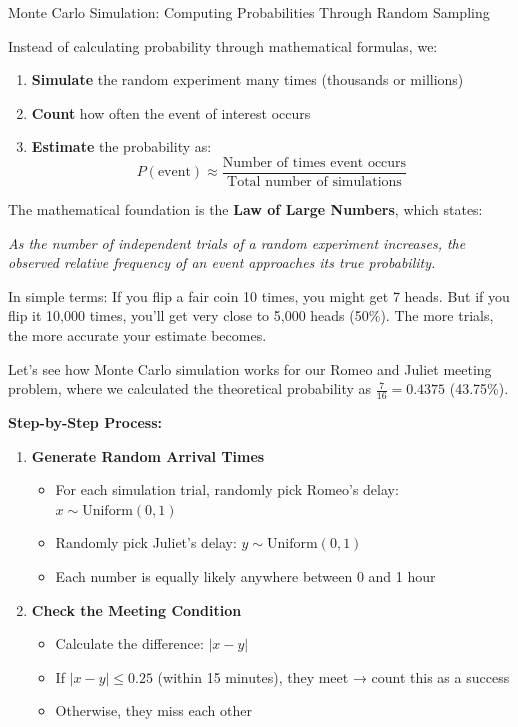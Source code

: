 \begin{itemize}
\begin{keyconceptboxbreak}{Monte Carlo Simulation: Computing Probabilities Through Random Sampling}

Instead of calculating probability through mathematical formulas, we:
\begin{enumerate}
    \item \textbf{Simulate} the random experiment many times (thousands or millions)
    \item \textbf{Count} how often the event of interest occurs
    \item \textbf{Estimate} the probability as:
    \[
    P(\text{event}) \approx \frac{\text{Number of times event occurs}}{\text{Total number of simulations}}
    \]
\end{enumerate}


The mathematical foundation is the \textbf{Law of Large Numbers}, which states:

\textit{As the number of independent trials of a random experiment increases, the observed relative frequency of an event approaches its true probability.}

In simple terms: If you flip a fair coin 10 times, you might get 7 heads. But if you flip it 10,000 times, you'll get very close to 5,000 heads (50\%). The more trials, the more accurate your estimate becomes.


Let's see how Monte Carlo simulation works for our Romeo and Juliet meeting problem, where we calculated the theoretical probability as $\frac{7}{16} = 0.4375$ (43.75\%).

\textbf{Step-by-Step Process:}

\begin{enumerate}
    \item \textbf{Generate Random Arrival Times}
    \begin{itemize}
        \item For each simulation trial, randomly pick Romeo's delay: $x \sim \text{Uniform}(0, 1)$
        \item Randomly pick Juliet's delay: $y \sim \text{Uniform}(0, 1)$
        \item Each number is equally likely anywhere between 0 and 1 hour
    \end{itemize}

    \item \textbf{Check the Meeting Condition}
    \begin{itemize}
        \item Calculate the difference: $|x - y|$
        \item If $|x - y| \leq 0.25$ (within 15 minutes), they meet → count this as a success
        \item Otherwise, they miss each other
    \end{itemize}


\end{enumerate}
\end{keyconceptboxbreak}
\end{itemize}
